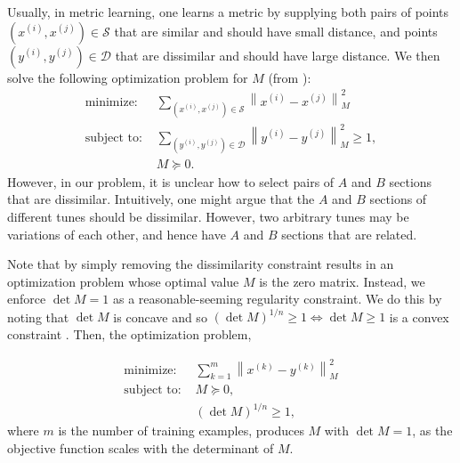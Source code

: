 \documentclass{article} %
\newcommand{\xip}{x^{(i)}}
\newcommand{\xjp}{x^{(j)}}
\newcommand{\yip}{y^{(i)}}
\newcommand{\yjp}{y^{(j)}}
\newcommand{\vectornorm}[1]{\left\| #1 \right\|}
\begin{document}
Usually, in metric learning, one learns a metric by supplying both pairs of
points $(\xip, \xjp) \in \mathcal{S}$ that are similar and should have small
distance, and points $(\yip, \yjp) \in \mathcal{D}$ that are dissimilar and
should have large distance. We then solve the following optimization problem for
$M$ (from \cite{metricNg}):
\begin{align*} 
\text{minimize: } &
\sum_{(x^{(i)}, x^{(j)}) \in \mathcal S} \vectornorm{x^{(i)} - x^{(j)}}_M^2 \\
\text{subject to: }
& \sum_{(y^{(i)}, y^{(j)}) \in \mathcal D}
	\vectornorm{y^{(i)} - y^{(j)}}_M^2 \ge 1, \\
& M \succeq 0.
\end{align*} 
However, in our problem, it is unclear how to select pairs of $A$ and $B$
sections that are dissimilar. Intuitively, one might argue that the $A$ and $B$
sections of different tunes should be dissimilar. However, two arbitrary tunes
may be variations of each other, and hence have $A$ and $B$ sections that are
related.

Note that by simply removing the dissimilarity constraint results in an
optimization problem whose optimal value $M$ is the zero matrix. Instead, we
enforce $\det M = 1$ as a reasonable-seeming regularity constraint. We do this
by noting that $\det M$ is concave and so 
$(\det M)^{1/n} \ge 1 \Leftrightarrow \det M \geq 1$ is a
convex constraint \cite{boyd}. Then, the optimization problem,

\begin{align*} 
\text{minimize: } & \sum_{k=1}^m \vectornorm{x^{(k)} - y^{(k)}}_M^2 \\
\text{subject to: }
& M \succeq 0, \\
& (\det M)^{1/n} \ge 1,
\end{align*} 
where $m$ is the number of training examples, produces $M$ with $\det M = 1$, as
the objective function scales with the determinant of $M$.
\end{document}
